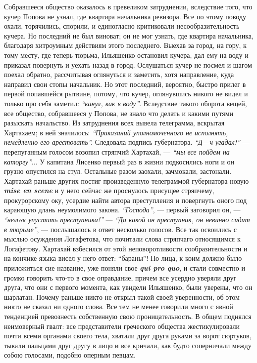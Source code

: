 \documentclass[a4paper,20pt]{article}
\begin{document}
Собравшееся общество оказалось в превеликом затруднении, вследствие того, 
что кучер Попова не узнал, где квартира начальника ревизора. Все по этому поводу охали,
торячились, спорили, и единогласно критиковали несообразительность кучера. 
Но последний не был виноват; он не мог
узнать, где квартира начальника, благодаря хитроумным действиям этого последнего. Выехав за город, на
гору, к тому месту, где теперь тюрьма, Ильяшенко остановил кучера, 
дал ему на воду и приказал повернуть
и уехать назад в город. Ослушаться кучер не посмел
и шагом поехал обратно, рассчитывая оглянуться и заметить,
хотя направление, куда направил свои стопы начальник. 
Но этот последний, вероятно, быстро прилег в
первой попавшейся рытвине, потому, что кучер, оглянувшись
никого не видел и только про себя заметил:
\emph{``канул, как в воду''}. Вследствие такого оборота вещей, все общество, 
собравшееся у Попова, не знало что делать и какими
путями разыскать начальство. Из затруднения всех вывела телеграмма, вскрытая Хартахаем;
в ней значилось: 
\emph{``Приказаний уполномоченного не исполнять, немедленно его арестовать''.}
Следовала подпись губернатора. \emph{``Д—ч угадал!''} —
перепуганным голосом возопил стряпчий Хартахай, — \emph{``мы
все пойдем на каторгу''}... У капитана Лисенко первый
раз в жизни подкосились ноги и он грузно опустился
на стул. Остальные разом заохали, зачмокали, застонали.
Хартахай раньше других постиг произведенную телеграммой губернатора новую \textbf{\em mise en scene} 
и у него сейчас же проснулось присущее стряпчему, прокурорскому оку,
усердие найти автора преступления и повергнуть оного под
карающую длань неумолимого закона. \emph{``Господа''}, — первый
заговорил он, — \emph{``нельзя упустить преступника!''} — \emph{``Да какой он преступник, он невинно сидит в тюрьме''}, —
послышалось в ответ несколько голосов. Все так освоились с мыслью осуждения Логафетова, что почитали слова
стряпчаго относящимся к Логафетову. Хартахай взбесился от этой
неповоротливости сообразительности и на кончике языка висел у него ответ:
``бараны''! Но лица, к коим должно было приложиться сие название, уже поняли
свое \textbf{\em qui pro quo}, и стали совместно и громко говорить что-то в
свое оправдание, причем все усердно уверяли друг друга, что они с первого
момента, как увидели Ильяшенко, были уверены, что он шарлатан.  Почему раньше
никто не открыл такой своей уверенности, об этом никто не сказал ни одного
слова.  Все тем не менее говорили много с явной тенденцией превознесть
собственную свою проницательность.  В общем поднялся неимоверный гвалт: все
представители греческого общества жестикулировали почти всеми органами своего
тела, хватали друг друга руками за ворот сюртуков, тыкали пальцами друг другу в
лицо и все кричали, как будто соперничали между собою голосами, подобно оперным
певцам.
\end{document}
